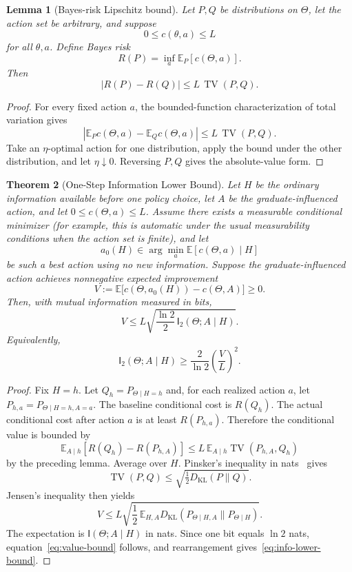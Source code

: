 \documentclass[11pt]{article}
\newtheorem{theorem}{Theorem}[section]
\newtheorem{lemma}[theorem]{Lemma}
\theoremstyle{definition}
\newcommand{\E}{\mathbb{E}}
\newcommand{\I}{\mathsf{I}}
\newcommand{\TV}{\operatorname{TV}}
\newcommand{\KL}{D_{\mathrm{KL}}}
\begin{document}
\begin{lemma}[Bayes-risk Lipschitz bound]
Let $P,Q$ be distributions on $\Theta$, let the action set be arbitrary, and suppose
\[
0\le c(\theta,a)\le L
\]
for all $\theta,a$.  Define Bayes risk
\[
R(P)=\inf_a \E_P[c(\Theta,a)].
\]
Then
\[
|R(P)-R(Q)|\le L\,\TV(P,Q).
\]
\end{lemma}

\begin{proof}
For every fixed action $a$, the bounded-function characterization of total variation gives
\[
|\E_P c(\Theta,a)-\E_Q c(\Theta,a)|\le L\,\TV(P,Q).
\]
Take an $\eta$-optimal action for one distribution, apply the bound under the other distribution, and let $\eta\downarrow0$.  Reversing $P,Q$ gives the absolute-value form.
\end{proof}

\begin{theorem}[One-Step Information Lower Bound]
Let $H$ be the ordinary information available before one policy choice, let $A$ be the graduate-influenced action, and let $0\le c(\Theta,a)\le L$.  Assume there exists a measurable conditional minimizer (for example, this is automatic under the usual measurability conditions when the action set is finite), and let
\[
a_0(H)\in\arg\min_a \E[c(\Theta,a)\mid H]
\]
be such a best action using no new information.  Suppose the graduate-influenced action achieves nonnegative expected improvement
\[
V
:=
\E\bigl[c(\Theta,a_0(H))-c(\Theta,A)\bigr]\ge0.
\]
Then, with mutual information measured in bits,
\begin{equation}
V
\le
L\sqrt{\frac{\ln 2}{2}\,\I_2(\Theta;A\mid H)}.
\label{eq:value-bound}
\end{equation}
Equivalently,
\begin{equation}
\boxed{
\I_2(\Theta;A\mid H)
\ge
\frac{2}{\ln 2}\left(\frac{V}{L}\right)^2
}.
\label{eq:info-lower-bound}
\end{equation}
\end{theorem}

\begin{proof}
Fix $H=h$.  Let $Q_h=P_{\Theta\mid H=h}$ and, for each realized action $a$, let $P_{h,a}=P_{\Theta\mid H=h,A=a}$.  The baseline conditional cost is $R(Q_h)$.  The actual conditional cost after action $a$ is at least $R(P_{h,a})$.  Therefore the conditional value is bounded by
\[
\E_{A\mid h}\left[R(Q_h)-R(P_{h,A})\right]
\le
L\,\E_{A\mid h}\TV(P_{h,A},Q_h)
\]
by the preceding lemma.  Average over $H$.  Pinsker's inequality in nats~\cite{coverthomas} gives
\[
\TV(P,Q)\le\sqrt{\tfrac12\KL(P\|Q)}.
\]
Jensen's inequality then yields
\[
V
\le
L\sqrt{\frac12\,
\E_{H,A}\KL(P_{\Theta\mid H,A}\|P_{\Theta\mid H})}.
\]
The expectation is $\I(\Theta;A\mid H)$ in nats.  Since one bit equals $\ln2$ nats, equation~\eqref{eq:value-bound} follows, and rearrangement gives~\eqref{eq:info-lower-bound}.
\end{proof}
\end{document}
